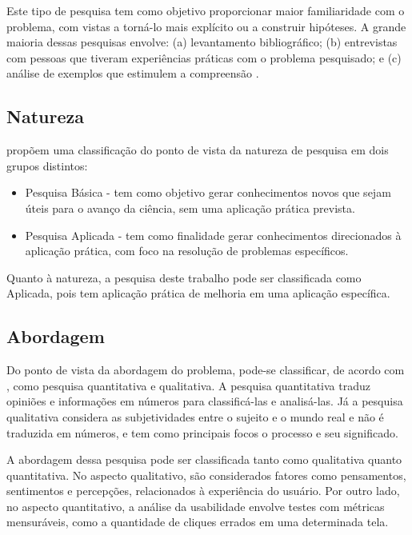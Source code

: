 Este tipo de pesquisa tem como objetivo proporcionar maior familiaridade com o problema, com vistas a torná-lo mais explícito ou a construir hipóteses. A grande maioria dessas pesquisas envolve: (a) levantamento 
bibliográfico; (b) 	entrevistas com pessoas que tiveram experiências práticas com o problema pesquisado; e (c) análise de exemplos que estimulem a compreensão \cite{gil2002}.

\subsection{Natureza}
\label{sec:Natureza}
 propõem uma classificação do ponto de vista da natureza de pesquisa em dois grupos distintos:

\begin{itemize}
	\item Pesquisa Básica - tem como objetivo gerar conhecimentos novos que sejam úteis para o avanço da ciência, sem uma aplicação prática prevista.
	\item Pesquisa Aplicada - tem como finalidade gerar conhecimentos direcionados à aplicação prática, com foco na resolução de problemas específicos.
\end{itemize}

Quanto à natureza, a pesquisa deste trabalho pode ser classificada como Aplicada, pois tem aplicação prática de melhoria em uma aplicação específica.

\subsection{Abordagem}
\label{sec:Abordagem}
Do ponto de vista da abordagem do problema, pode-se classificar, de acordo com , como pesquisa quantitativa e qualitativa. A pesquisa quantitativa traduz opiniões e informações em números para classificá-las e analisá-las. 
Já a pesquisa qualitativa considera as subjetividades entre o sujeito e o mundo real e não é traduzida em números, e tem como principais focos o processo e seu significado.

A abordagem dessa pesquisa pode ser classificada tanto como qualitativa quanto quantitativa. No aspecto qualitativo, são considerados fatores como pensamentos, sentimentos e percepções, relacionados à experiência 
do usuário. Por outro lado, no aspecto quantitativo, a análise da usabilidade envolve testes com métricas mensuráveis, como a quantidade de cliques errados em uma determinada tela.

